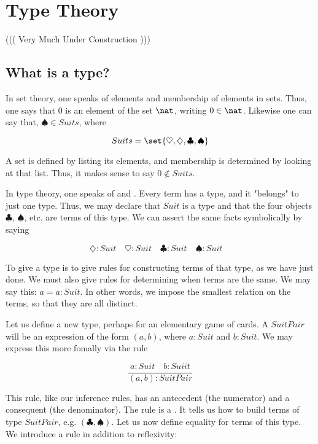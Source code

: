 \section{Type Theory}

((( Very Much Under Construction )))

\innertableofcontents

\subsection{What is a type?}


In set theory, one speaks of elements and membership of elements in sets.  Thus, one says that $0$ is an element of the set $\nat$, writing $0 \in \nat$.  Likewise one can say that, $\spadesuit \in Suits$, where 

$$ Suits = \set{\heartsuit, \diamondsuit, \clubsuit, \spadesuit }$$

A set is defined by listing its elements, and membership is determined by looking at that list.  Thus, it makes sense to say $0 \not\in Suits$.  

In type theory, one speaks of  and .  Every term has a type, and it "belongs" to just one type.  Thus, we may declare that $Suit$ is a type and that the four objects $\clubsuit$, $\spadesuit$, etc. are terms of this type.  We can assert the same facts symbolically by saying

$$
\diamondsuit : Suit \quad
\heartsuit : Suit \quad
\clubsuit : Suit \quad
\spadesuit : Suit \quad
$$

To give a type is to give rules for constructing terms of that type, as we have just done.  We must also give rules for determining when terms are the same.  We may say this:  $a = a : Suit$.  In other words, we impose the smallest relation on the terms, so that they are all distinct.

Let us define a new type, perhaps for an elementary game of cards.  A $SuitPair$ will be an expression of the form $(a,b)$, where $a : Suit$ and $b : Suit$.  We may express this more fomally via the rule 

$$
\frac{a : Suit \quad b : Suiit}{(a,b) : SuitPair}
$$

This rule, like our inference rules, has an antecedent (the numerator) and a consequent (the denominator).  The rule is a .  It tells us how to build terms of type $SuitPair$, e.g. $(\clubsuit, \spadesuit)$.  Let us now define equality for terms of this type.  We introduce a rule in addition to reflexivity: 

